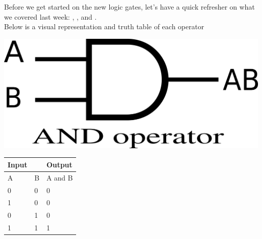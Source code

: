 

 
\begin{center}
	Before we get started on the new logic gates, let's have a quick refresher on what we covered last week: , , and  . \\Below is a visual representation and truth table of each operator
\end{center}

\vspace{20mm}
\hspace{1in}
\begin{minipage}{.5\linewidth}
    \includegraphics[width=3 in]{images/and.png}
	\label{img2}
\end{minipage}
\begin{minipage}{\linewidth}
\begin{tabular}{|ll|l|}
	\hline
	Input                   &   & Output  \\ \hline
	\multicolumn{1}{|l|}{A} & B & A and B \\ \hline
	\multicolumn{1}{|l|}{0} & 0 & 0       \\ \hline
	\multicolumn{1}{|l|}{1} & 0 & 0       \\ \hline
	\multicolumn{1}{|l|}{0} & 1 & 0       \\ \hline
	\multicolumn{1}{|l|}{1} & 1 & 1       \\ \hline
\end{tabular}
\end{minipage}


